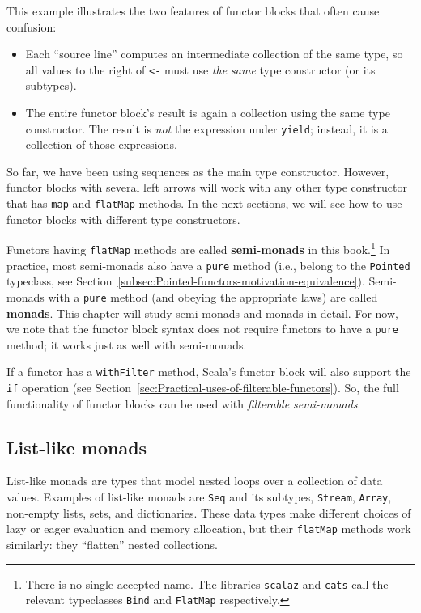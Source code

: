 \vspace{0.2\baselineskip}
This example illustrates the two features of functor blocks that often
cause confusion:
\begin{itemize}
\item Each \textsf{``}source line\textsf{''} computes an intermediate collection of the
same type, so all values to the right of \lstinline!<-! must use
\emph{the same} type constructor (or its subtypes).
\item The entire functor block\textsf{'}s result is again a collection using the
same type constructor. The result is \emph{not} the expression under
\lstinline!yield!; instead, it is a collection of those expressions.
\end{itemize}
So far, we have been using sequences as the main type constructor.
However, functor blocks with several left arrows will work with any
other type constructor that has \lstinline!map! and \lstinline!flatMap!
methods. In the next sections, we will see how to use functor blocks
with different type constructors. 

Functors having \lstinline!flatMap! methods are called \textbf{semi-monads}
in this book.\footnote{There is no single accepted name. The libraries \texttt{scalaz} and
\texttt{cats} call the relevant typeclasses \lstinline!Bind! and
\lstinline!FlatMap! respectively.} In practice, most semi-monads also have a \lstinline!pure! method
(i.e., belong to the \lstinline!Pointed! typeclass, see Section~\ref{subsec:Pointed-functors-motivation-equivalence}).
Semi-monads with a \lstinline!pure! method (and obeying the appropriate
laws) are called \textbf{monads}. This chapter will
study semi-monads and monads in detail. For now, we note that the
functor block syntax does not require functors to have a \lstinline!pure!
method; it works just as well with semi-monads.

If a functor has a \lstinline!withFilter! method, Scala\textsf{'}s functor
block will also support the \lstinline!if! operation (see Section~\ref{sec:Practical-uses-of-filterable-functors}).
So, the full functionality of functor blocks can be used with \emph{filterable
semi-monads}.

\subsection{List-like monads}

List-like monads are types that model nested loops over a collection
of data values. Examples of list-like monads are \lstinline!Seq!
and its subtypes, \lstinline!Stream!, \lstinline!Array!, non-empty
lists, sets, and dictionaries. These data types make different choices
of lazy or eager evaluation and memory allocation, but their \lstinline!flatMap!
methods work similarly: they \textsf{``}flatten\textsf{''} nested collections. 


